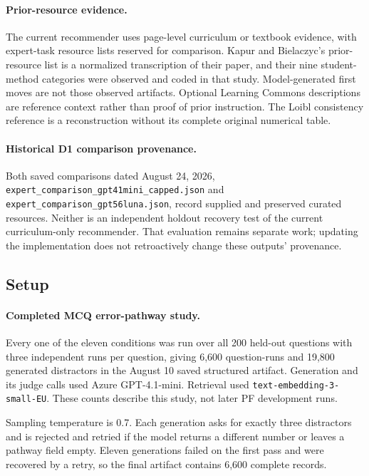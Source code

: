 \paragraph{Prior-resource evidence.} The current recommender uses page-level curriculum or textbook evidence, with expert-task resource lists reserved for comparison. Kapur and Bielaczyc's prior-resource list is a normalized transcription of their paper, and their nine student-method categories were observed and coded in that study. Model-generated first moves are not those observed artifacts. Optional Learning Commons descriptions are reference context rather than proof of prior instruction. The Loibl consistency reference is a reconstruction without its complete original numerical table.

\paragraph{Historical D1 comparison provenance.} Both saved comparisons dated August 24, 2026, \texttt{expert\_comparison\_gpt41mini\_capped.json} and \texttt{expert\_comparison\_gpt56luna.json}, record supplied and preserved curated resources. Neither is an independent holdout recovery test of the current curriculum-only recommender. That evaluation remains separate work; updating the implementation does not retroactively change these outputs' provenance.

\subsection{Setup}

\paragraph{Completed MCQ error-pathway study.} Every one of the eleven conditions was run over all 200 held-out questions with three independent runs per question, giving 6{,}600 question-runs and 19{,}800 generated distractors in the August 10 saved structured artifact. Generation and its judge calls used Azure GPT-4.1-mini. Retrieval used \texttt{text-embedding-3-small-EU}. These counts describe this study, not later PF development runs.

Sampling temperature is 0.7. Each generation asks for exactly three distractors and is rejected and retried if the model returns a different number or leaves a pathway field empty. Eleven generations failed on the first pass and were recovered by a retry, so the final artifact contains 6{,}600 complete records.

